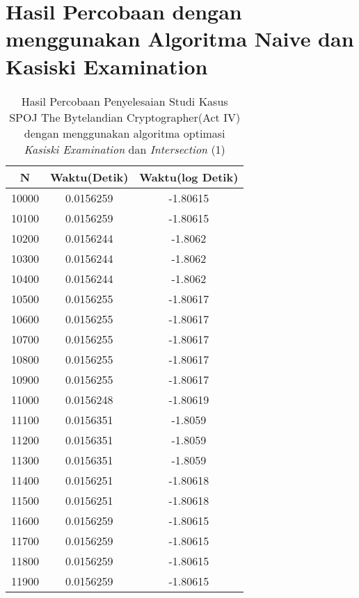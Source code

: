\chapter{Hasil Percobaan dengan menggunakan Algoritma Naive dan Kasiski Examination}
\setcounter{table}{0}
  \renewcommand{\thetable}{B.\arabic{table}}
  \renewcommand{\thefigure}{B.\arabic{figure}}

\begin{table}[H]
\centering
\caption {Hasil Percobaan Penyelesaian Studi Kasus SPOJ The Bytelandian Cryptographer(Act IV) dengan menggunakan algoritma optimasi \textit{Kasiski Examination} dan \textit{Intersection} (1)}
\begin{tabular}{|c|c|c|}\hline
N&Waktu(Detik)&Waktu(log Detik)\\ \hline
10000&0.0156259&-1.80615\\ \hline
10100&0.0156259&-1.80615\\ \hline
10200&0.0156244&-1.8062\\ \hline
10300&0.0156244&-1.8062\\ \hline
10400&0.0156244&-1.8062\\ \hline
10500&0.0156255&-1.80617\\ \hline
10600&0.0156255&-1.80617\\ \hline
10700&0.0156255&-1.80617\\ \hline
10800&0.0156255&-1.80617\\ \hline
10900&0.0156255&-1.80617\\ \hline
11000&0.0156248&-1.80619\\ \hline
11100&0.0156351&-1.8059\\ \hline
11200&0.0156351&-1.8059\\ \hline
11300&0.0156351&-1.8059\\ \hline
11400&0.0156251&-1.80618\\ \hline
11500&0.0156251&-1.80618\\ \hline
11600&0.0156259&-1.80615\\ \hline
11700&0.0156259&-1.80615\\ \hline
11800&0.0156259&-1.80615\\ \hline
11900&0.0156259&-1.80615\\ \hline
\end{tabular}
\label{tab:res3}
\end{table}
